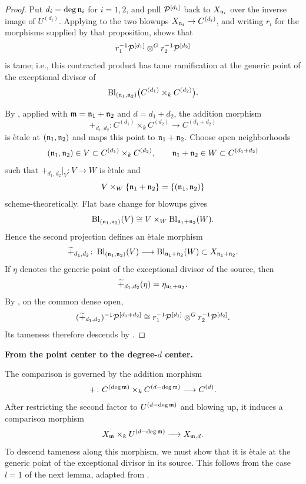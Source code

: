 \begin{proof}
Put $d_i=\deg\mathfrak{n}_i$ for $i=1,2$, and pull $\mathcal{P}^{[d_i]}$ back to
$X_{\mathfrak{n}_i}$ over the inverse image of $U^{(d_i)}$. Applying
 to the two blowups
$X_{\mathfrak{n}_i}\to C^{(d_i)}$, and writing $r_i$ for the morphisms supplied
by that proposition, shows that
\[
r_1^{-1}\mathcal{P}^{[d_1]}\otimes^G r_2^{-1}\mathcal{P}^{[d_2]}
\]
is tame; i.e., this contracted product has tame ramification at the generic
point of the exceptional divisor of
\[
\operatorname{Bl}_{(\mathfrak{n}_1,\mathfrak{n}_2)}
   \bigl(C^{(d_1)}\times_k C^{(d_2)}\bigr).
\]

By , applied with
$\mathfrak{m}=\mathfrak{n}_1+\mathfrak{n}_2$ and $d=d_1+d_2$, the addition morphism
\[
+_{d_1,d_2}\colon
C^{(d_1)}\times_k C^{(d_2)}
\longrightarrow C^{(d_1+d_2)}
\]
is \`etale at $(\mathfrak{n}_1,\mathfrak{n}_2)$ and maps this point to
$\mathfrak{n}_1+\mathfrak{n}_2$. Choose open neighborhoods
\[
(\mathfrak{n}_1,\mathfrak{n}_2)\in V\subset C^{(d_1)}\times_k C^{(d_2)},
\qquad
\mathfrak{n}_1+\mathfrak{n}_2\in W\subset C^{(d_1+d_2)}
\]
such that $+_{d_1,d_2}|_V\colon V\to W$ is \`etale and
\[
V\times_W\{\mathfrak{n}_1+\mathfrak{n}_2\}=\{(\mathfrak{n}_1,\mathfrak{n}_2)\}
\]
scheme-theoretically. Flat base change for blowups gives
\[
\operatorname{Bl}_{(\mathfrak{n}_1,\mathfrak{n}_2)}(V)
\cong
V\times_W\operatorname{Bl}_{\mathfrak{n}_1+\mathfrak{n}_2}(W).
\]
Hence the second projection defines an \`etale morphism
\[
\widetilde{+}_{d_1,d_2}\colon
\operatorname{Bl}_{(\mathfrak{n}_1,\mathfrak{n}_2)}(V)
\longrightarrow
\operatorname{Bl}_{\mathfrak{n}_1+\mathfrak{n}_2}(W)
\subset X_{\mathfrak{n}_1+\mathfrak{n}_2}.
\]
If $\eta$ denotes the generic point of the exceptional divisor of the
source, then
\[
\widetilde{+}_{d_1,d_2}(\eta)=\eta_{\mathfrak{n}_1+\mathfrak{n}_2}.
\]
By , on the common dense open,
\[
(\widetilde{+}_{d_1,d_2})^{-1}\mathcal{P}^{[d_1+d_2]}
\cong
r_1^{-1}\mathcal{P}^{[d_1]}\otimes^G r_2^{-1}\mathcal{P}^{[d_2]}.
\]
Its tameness therefore descends by
.
\end{proof}

\noindent\textbf{From the point center to the degree-$d$ center.}

The comparison is governed by the addition morphism
\[
+\colon C^{(\deg\mathfrak{m})}\times_k C^{(d-\deg\mathfrak{m})}\longrightarrow C^{(d)}.
\]
After restricting the second factor to $U^{(d-\deg\mathfrak{m})}$ and blowing up,
it induces a comparison morphism
\[
X_{\mathfrak{m}}\times_k U^{(d-\deg\mathfrak{m})}\longrightarrow X_{\mathfrak{m},d}.
\]
To descend tameness along this morphism, we must show that it is \`etale at
the generic point of the exceptional divisor in its source. This follows
from the case $l=1$ of the next lemma, adapted from
\cite[Lemma~4.1]{takeuchi2018blow}.

